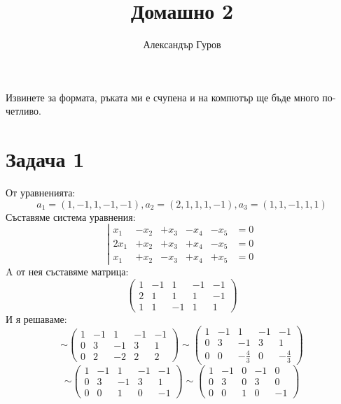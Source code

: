 \documentclass{article}
\title{Домашно 2}
\author{Александър Гуров}
\date{\datebulgarian{\today}}
\begin{document}
\maketitle
Извинете за формата, ръката ми е счупена и на компютър ще бъде много по-четливо.

\section*{Задача 1} %
От уравненията:
\[
    a_1 = (1, -1, 1, -1, -1),  a_2 = (2, 1, 1, 1, -1),  a_3 = (1, 1, -1, 1, 1)
\]
Съставяме система уравнения:
\[
    \left| \begin{array}{cccccc}
        x_1   & - x_2 & + x_3 & - x_4 & - x_5 & =0 \\
        2 x_1 & + x_2 & + x_3 & + x_4 & - x_5 & =0 \\
        x_1   & + x_2 & - x_3 & + x_4 & + x_5 & =0
    \end{array}
    \right.
\]
A от нея съставяме матрица:
\[
    \left(
    \begin{array}{ccccc}
            1 & -1 & 1  & -1 & -1 \\
            2 & 1  & 1  & 1  & -1 \\
            1 & 1  & -1 & 1  & 1
        \end{array}
    \right)
\]
И я решаваме:
\[
    \sim\left(
    \begin{array}{ccccc}
            1 & -1 & 1  & -1 & -1 \\
            0 & 3  & -1 & 3  & 1  \\
            0 & 2  & -2 & 2  & 2
        \end{array}
    \right)
    \sim\left(
    \begin{array}{ccccc}
            1 & -1 & 1            & -1 & -1           \\
            0 & 3  & -1           & 3  & 1            \\
            0 & 0  & -\frac{4}{3} & 0  & -\frac{4}{3}
        \end{array}
    \right)
\]
\[
    \sim\left(
    \begin{array}{ccccc}
            1 & -1 & 1  & -1 & -1 \\
            0 & 3  & -1 & 3  & 1  \\
            0 & 0  & 1  & 0  & -1
        \end{array}
    \right)
    \sim\left(
    \begin{array}{ccccc}
            1 & -1 & 0 & -1 & 0  \\
            0 & 3  & 0 & 3  & 0  \\
            0 & 0  & 1 & 0  & -1
        \end{array}
    \right)
\]
\end{document}
